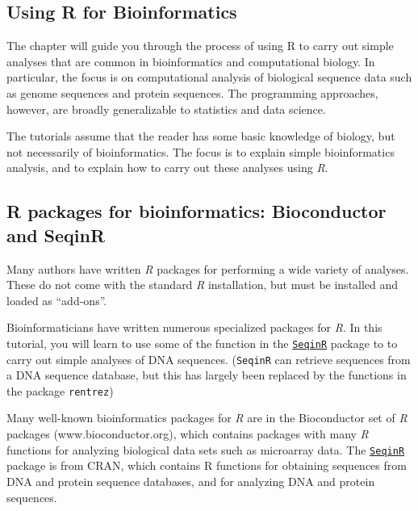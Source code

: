 \documentclass[
]{book}
\begin{document}
\hypertarget{using-r-for-bioinformatics}{%
\subsection{Using R for Bioinformatics}\label{using-r-for-bioinformatics}}

The chapter will guide you through the process of using R to carry out simple analyses that are common in bioinformatics and computational biology. In particular, the focus is on computational analysis of biological sequence data such as genome sequences and protein sequences. The programming approaches, however, are broadly generalizable to statistics and data science.

The tutorials assume that the reader has some basic knowledge of biology, but not necessarily of bioinformatics. The focus is to explain simple bioinformatics analysis, and to explain how to carry out these analyses using \emph{R}.

\hypertarget{r-packages-for-bioinformatics-bioconductor-and-seqinr}{%
\subsection{R packages for bioinformatics: Bioconductor and SeqinR}\label{r-packages-for-bioinformatics-bioconductor-and-seqinr}}

Many authors have written \emph{R} packages for performing a wide variety of analyses. These do not come with the standard \emph{R} installation, but must be installed and loaded as ``add-ons''.

Bioinformaticians have written numerous specialized packages for \emph{R}. In this tutorial, you will learn to use some of the function in the \href{https://cran.r-project.org/web/packages/seqinr/index.html}{\texttt{SeqinR}} package to to carry out simple analyses of DNA sequences. (\texttt{SeqinR} can retrieve sequences from a DNA sequence database, but this has largely been replaced by the functions in the package \texttt{rentrez})

Many well-known bioinformatics packages for \emph{R} are in the Bioconductor set of \emph{R} packages (www.bioconductor.org), which contains packages with many \emph{R} functions for analyzing biological data sets such as microarray data. The \href{https://cran.r-project.org/web/packages/seqinr/index.html}{\texttt{SeqinR}} package is from CRAN, which contains R functions for obtaining sequences from DNA and protein sequence databases, and for analyzing DNA and protein sequences.
\end{document}
